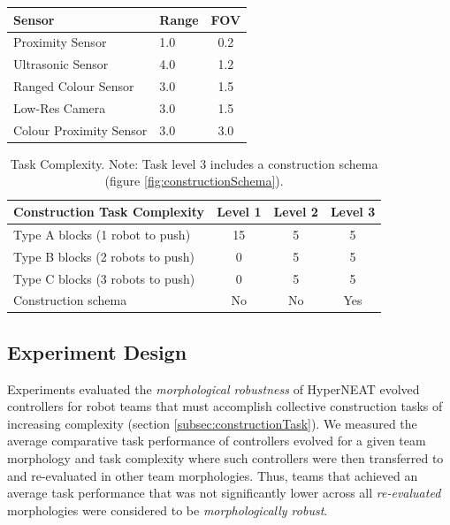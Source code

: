 \documentclass[conference]{IEEEtran}
\begin{document}
\begin{table}
\begin{tabular}{llc}
		\hline
		Sensor                                                 & Range     & FOV \\
		\hline
		Proximity Sensor		                               & 	1.0	   &  0.2  \\
		Ultrasonic Sensor		                               &	4.0    &  1.2  \\
		Ranged Colour Sensor	                               &	3.0	   &  1.5 \\
		Low-Res Camera			                               & 	3.0	   &  1.5 \\
		Colour Proximity Sensor                                & 	3.0	   &  3.0 \\
		\hline
	\end{tabular}
\end{table}

\begin{table}[t]
	\renewcommand{\arraystretch}{1.30}
	\caption{Task Complexity. Note: Task level 3 includes a construction schema (figure \ref{fig:constructionSchema}).}\label{tab:taskComplexity}
	\centering
	\begin{tabular}{lccc}
		\hline
		Construction Task Complexity                               & Level 1     & Level 2    & Level 3   \\
		\hline
		Type A blocks (1 robot to push)	                           & 	15	     & 5          & 5  \\
		Type B blocks (2 robots to push)		                   &	0 	     & 5          & 5  \\
		Type C blocks (3 robots to push)	                       &  	0	     & 5          & 5  \\
		Construction schema                                        &   No        & No         &	Yes \\
\hline
	\end{tabular}
\end{table}

\subsection{Experiment Design}\label{subsec:expDesign}

Experiments evaluated the \textit{morphological robustness} of HyperNEAT evolved controllers for
robot teams that must accomplish collective construction tasks of increasing
complexity (section \ref{subsec:constructionTask}).
We measured the average comparative task performance of controllers evolved
for a given team morphology and task complexity where such controllers were
then transferred to
and re-evaluated in other team morphologies.
Thus, teams that achieved an average task performance that was not significantly lower
across all \textit{re-evaluated} morphologies were considered to be \textit{morphologically robust}.
\end{document}
